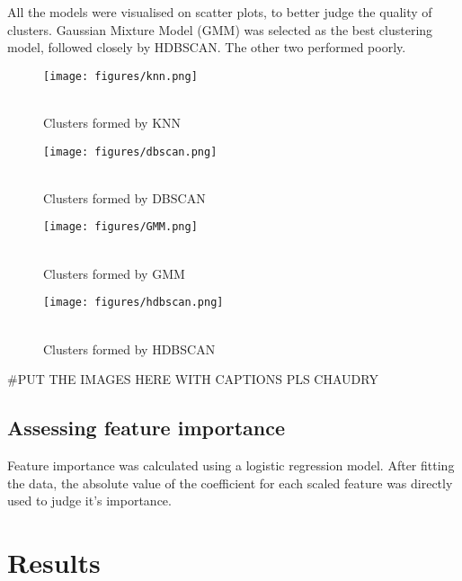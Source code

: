 \documentclass[12pt,twocolumn,letterpaper]{article}
\begin{document}
	All the models were visualised on scatter plots, to better judge the quality of clusters. Gaussian Mixture Model (GMM) was selected as the best clustering model, followed closely by HDBSCAN. The other two performed poorly.
    
\begin{figure}[H]
  \centering
  \texttt{[image: figures/knn.png]}
    \caption{\\Clusters formed by KNN\\}
\end{figure}

\begin{figure}[H]
  \centering
  \texttt{[image: figures/dbscan.png]}
    \caption{\\Clusters formed by DBSCAN\\}
\end{figure}
\begin{figure}[H]
  \centering
  \texttt{[image: figures/GMM.png]}
    \caption{\\Clusters formed by GMM\\}
\end{figure}
\begin{figure}[H]
  \centering
  \texttt{[image: figures/hdbscan.png]}
    \caption{\\Clusters formed by HDBSCAN\\}
\end{figure}
 #PUT THE IMAGES HERE WITH CAPTIONS PLS CHAUDRY

\subsection{Assessing feature importance}
Feature importance was calculated using a logistic regression model. After fitting the data, the absolute value of the coefficient for each scaled feature was directly used to judge it's importance.

\section{Results}
\end{document}
